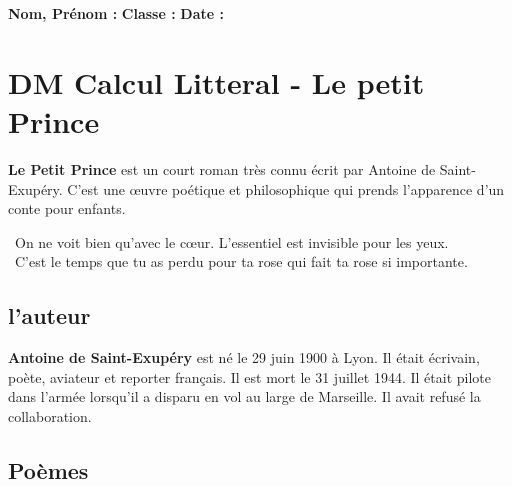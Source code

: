 \documentclass[12pt]{article}
\begin{document}

\newcommand{\Pointilles}[1][3]{%
  \multido{}{#1}{\makebox[\linewidth]{\dotfill}\\[\parskip]
}}


\setlength{\columnseprule}{1pt}

\textbf{Nom, Prénom :} \hspace{8cm} \textbf{Classe :} \hspace{3cm} \textbf{Date :}\\
\vspace{-0.8cm}

\section*{DM Calcul Litteral - Le petit Prince}

\textbf{Le Petit Prince} est un court roman très connu écrit par Antoine de Saint-Exupéry. 
C'est une œuvre poétique et philosophique qui prends l'apparence d'un conte pour enfants. 

\begin{center}
  {\selectfont \og On ne voit bien qu'avec le cœur. L'essentiel est invisible pour les yeux. \fg }\\
  {\selectfont \og C'est le temps que tu as perdu pour ta rose qui fait ta rose si importante. \fg}\\

\end{center}

\subsection*{l’auteur }
\textbf{Antoine de Saint-Exupéry} est né le 29 juin 1900 à Lyon. Il était  écrivain, poète, aviateur et reporter français. Il est mort le 31 juillet 1944. Il était pilote dans l’armée lorsqu’il a disparu en vol au large de Marseille. Il avait refusé la collaboration.

\subsection*{Poèmes}
\end{document}
